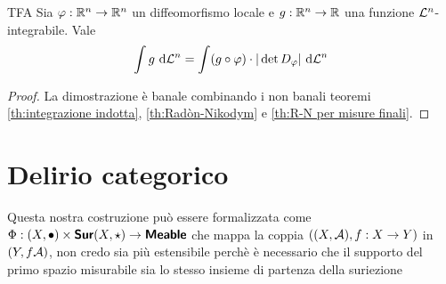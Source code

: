 \documentclass{article}
\begin{document}
\begin{theorem}{TFA}{}
    Sia $\varphi : \mathbb{R}^n \to \mathbb{R}^n$ un diffeomorfismo locale e $g : \mathbb{R}^n \to \mathbb{R}$ una funzione $\mathcal{L}^n$-integrabile. Vale
    \[\int\limits g \text{ d} \mathcal{L}^n = \int (g \circ \varphi)\cdot |\det D_\varphi|\text{ d} \mathcal{L}^n\]
    \begin{proof}
        La dimostrazione è banale combinando i non banali teoremi \ref{th:integrazione indotta}, \ref{th:Radòn-Nikodym} e \ref{th:R-N per misure finali}.
    \end{proof}
\end{theorem}

\section{Delirio categorico}

Questa nostra costruzione può essere formalizzata come $\Phi : (X,\bullet) \times \text{\sffamily\textbf{Sur}}(X,\star) \to \text{\sffamily\textbf{Meable}}$ che mappa la coppia $((X,\mathcal{A}), f:X\to Y)$ in $(Y,f\mathcal{A})$, non credo sia più estensibile perchè è necessario che il supporto del primo spazio misurabile sia lo stesso insieme di partenza della suriezione
\end{document}
